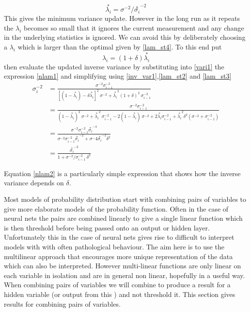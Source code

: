 \documentclass[a4paper,oneside,english]{book}
\numberwithin{equation}{section}
\numberwithin{figure}{section}
\begin{document}
\begin{equation}\label{lam_st4}
\stackrel{*}{\lambda_i}=\sigma^{-2}/\stackrel{*}{\sigma_{i}}^{-2}
\end{equation} 
This gives the minimum variance update. However in the long run as it repeats the $\lambda_i$ becomes so small that it ignores the current measurement and any change in the underlying statistics is ignored. We can avoid this by deliberately choosing a $\lambda_i$ which is larger than the optimal given by \eqref{lam_st4}. To this end put 
\begin{equation}\label{nlam1}
\lambda_i = (1+\delta)\stackrel{*}{\lambda_i}
\end{equation} 
then evaluate the updated inverse variance by substituting into
\eqref{vari1} the expression \eqref{nlam1} and simplifying using \eqref{inv_var1},\eqref{lam_st2} and \eqref{lam_st3}
\begin{align}
\sigma_i^{-2}&= \frac{\sigma^{-2} \sigma_{i-1}^{-2}}
{[(1-\stackrel{*}{\lambda_i})-\delta \stackrel{*}{\lambda_i}]^2\: \sigma^{-2}+\stackrel{*}{\lambda_i}^2 (1+\delta)^2\: \sigma_{i-1}^{-2}}\\
&= \frac{\sigma^{-2} \sigma_{i-1}^{-2}}{(1-\stackrel{*}{\lambda_i})^2\:\sigma^{-2}+ \stackrel{*}{\lambda_i}^2\:\sigma_{i-1}^{-2} 
	-2(1-\stackrel{*}{\lambda_i})\:\sigma^{-2}
	+2\stackrel{*}{\lambda_i}\sigma_{i-1}^{-2}
	+\stackrel{*}{\lambda_i}^2\delta^2(\sigma^{-2}+\sigma_{i-1}^{-2}) }	\\
&=\frac{\sigma^{-2}\sigma_{i-1}^{-2}\stackrel{*}{\sigma_i}^{-4} } 
{\sigma^{-2}\sigma_{i-1}^{-2}\stackrel{*}{\sigma_i}^{-2}+\sigma^-4 \stackrel{*}{\sigma_i}^{-2}\delta^2 }\\
&=\frac{\stackrel{*}{\sigma_i}^{-2}}
{1+\sigma^{-2}/\sigma_{i-1}^{-2}\:\delta^2 }\label{nlam2}
\end{align}

Equation \eqref{nlam2} is a particularly simple expression that shows how the inverse variance depends on $\delta$.


Most models of probability distribution start with combining pairs
of variables to give more elaborate models of the probability function.
Often in the case of neural nets the pairs are combined linearly
to give a single linear function which is then threshold before
being passed onto an output or hidden layer. Unfortunately this in
the case of neural nets gives rise to difficult to interpret models
with with often pathological behaviour. The aim here is to use the
multilinear approach that encourages more unique representation of
the data which can also be interpreted. However multi-linear functions
are only linear on each variable in isolation and are in general non
linear, hopefully in a useful way. When combining pairs of variables
we will combine to produce a result for a hidden variable (or output
from this ) and not threshold it. This section gives
results for combining pairs of variables. 
\end{document}

